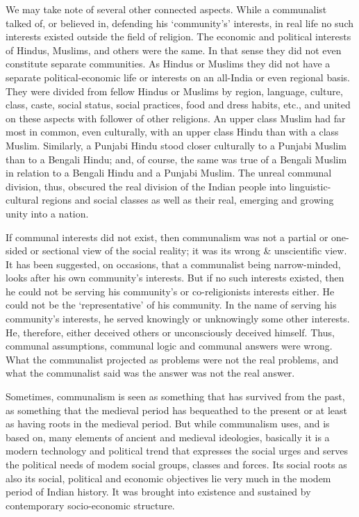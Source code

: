 \begin{multicols}{2}
We may take note of several other connected aspects. While a communalist talked of, or believed in, defending his `community's' interests, in real life no such interests existed outside the field of religion. The economic and political interests of Hindus, Muslims, and others were the same. In that sense they did not even constitute separate communities. As Hindus or Muslims they did not have a separate political-economic life or interests on an all-India or even regional basis. They were divided from fellow Hindus or Muslims by region, language, culture, class, caste, social status, social practices, food and dress habits, etc., and united on these aspects with follower of other religions. An upper class Muslim had far most in common, even culturally, with an upper class Hindu than with a class Muslim. Similarly, a Punjabi Hindu stood closer culturally to a Punjabi Muslim than to a Bengali Hindu; and, of course, the same was true of a Bengali Muslim in relation to a Bengali Hindu and a Punjabi Muslim. The unreal communal division, thus, obscured the real division of the Indian people into linguistic-cultural regions and social classes as well as their real, emerging and growing unity into a nation.

If communal interests did not exist, then communalism was not a partial or one-sided or sectional view of the social reality; it was its wrong \& unscientific view. It has been suggested, on occasions, that a communalist being narrow-minded, looks after his own community's interests. But if no such interests existed, then he could not be serving his community's or co-religionists interests either. He could not be the `representative' of his community. In the name of serving his community's interests, he served knowingly or unknowingly some other interests. He, therefore, either deceived others or unconsciously deceived himself. Thus, communal assumptions, communal logic and communal answers were wrong. What the communalist projected as problems were not the real problems, and what the communalist said was the answer was not the real answer.

Sometimes, communalism is seen as something that has survived from the past, as something that the medieval period has bequeathed to the present or at least as having roots in the medieval period. But while communalism uses, and is based on, many elements of ancient and medieval ideologies, basically it is a modern technology and political trend that expresses the social urges and serves the political needs of modem social groups, classes and forces. Its social roots as also its social, political and economic objectives lie very much in the modem period of Indian history. It was brought into existence and sustained by contemporary socio-economic structure.


\end{multicols}
